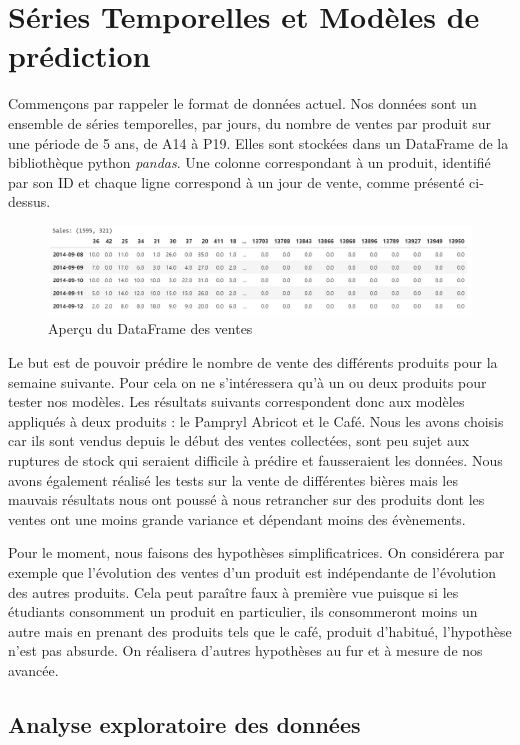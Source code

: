 \section{Séries Temporelles et Modèles de prédiction}
\label{sec:modeles}

Commençons par rappeler le format de données actuel. Nos données sont un ensemble de séries temporelles, par jours, du nombre de ventes par produit sur une période de 5 ans, de A14 à P19. Elles sont stockées dans un DataFrame de la bibliothèque python \emph{pandas}. Une colonne correspondant à un produit, identifié par son ID et chaque ligne correspond à un jour de vente, comme présenté ci-dessus.
\begin{figure}[H]
    \centering
    \includegraphics[width=\textwidth]{figures/sales_df.png}
    \caption{Aperçu du DataFrame des ventes}
    \label{fig:sales_df}
\end{figure}

Le but est de pouvoir prédire le nombre de vente des différents produits pour la semaine suivante. Pour cela on ne s'intéressera qu'à un ou deux produits pour tester nos modèles. Les résultats suivants correspondent donc aux modèles appliqués à deux produits : le Pampryl Abricot et le Café. Nous les avons choisis car ils sont vendus depuis le début des ventes collectées, sont peu sujet aux ruptures de stock qui seraient difficile à prédire et fausseraient les données.
Nous avons également réalisé les tests sur la vente de différentes bières mais les mauvais résultats nous ont poussé à nous retrancher sur des produits dont les ventes ont une moins grande variance et dépendant moins des évènements.

Pour le moment, nous faisons des hypothèses simplificatrices. On considérera par exemple que l'évolution des ventes d'un produit est indépendante de l'évolution des autres produits. Cela peut paraître faux à première vue puisque si les étudiants consomment un produit en particulier, ils consommeront moins un autre mais en prenant des produits tels que le café, produit d'habitué, l'hypothèse n'est pas absurde. On réalisera d'autres hypothèses au fur et à mesure de nos avancée.


\subsection{Analyse exploratoire des données}
\label{subsec:expl_data}

